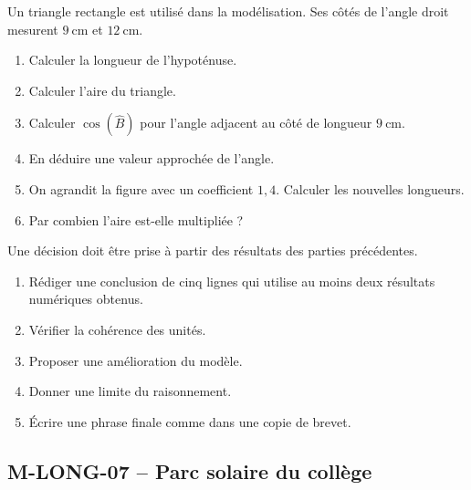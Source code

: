 \documentclass[11pt,a4paper]{article}
\newcounter{exercice}
\begin{document}
\begin{exercice}
Un triangle rectangle est utilisé dans la modélisation. Ses côtés de l'angle droit mesurent $9\ \mathrm{cm}$ et $12\ \mathrm{cm}$.
\begin{enumerate}
  \item Calculer la longueur de l'hypoténuse.
  \item Calculer l'aire du triangle.
  \item Calculer $\cos(\widehat{B})$ pour l'angle adjacent au côté de longueur $9\ \mathrm{cm}$.
  \item En déduire une valeur approchée de l'angle.
  \item On agrandit la figure avec un coefficient $1{,}4$. Calculer les nouvelles longueurs.
  \item Par combien l'aire est-elle multipliée ?
\end{enumerate}
\end{exercice}

\begin{exercice}
Une décision doit être prise à partir des résultats des parties précédentes.
\begin{enumerate}
  \item Rédiger une conclusion de cinq lignes qui utilise au moins deux résultats numériques obtenus.
  \item Vérifier la cohérence des unités.
  \item Proposer une amélioration du modèle.
  \item Donner une limite du raisonnement.
  \item Écrire une phrase finale comme dans une copie de brevet.
\end{enumerate}
\end{exercice}
\newpage
\subsection{M-LONG-07 -- Parc solaire du collège}
\end{document}
